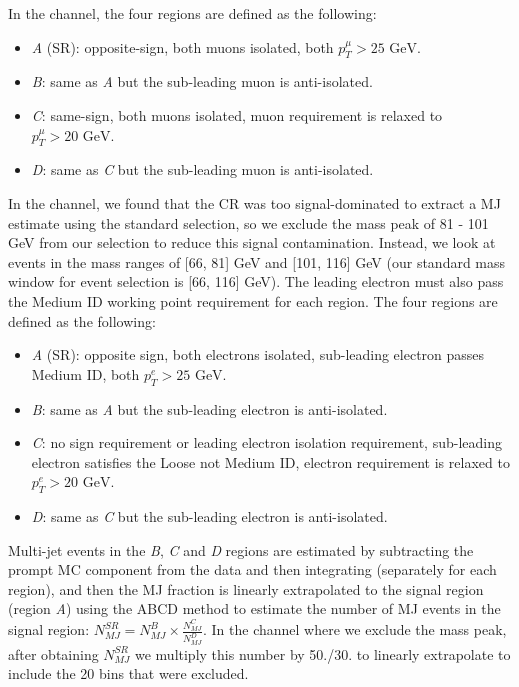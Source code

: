 In the \Zmm channel, the four regions are defined as the following:
\begin{itemize}
\item \textit{A} (SR): opposite-sign, both muons isolated, both $p_{T}^{\mu} > 25 \textrm{ GeV}$.
\item \textit{B}: same as \textit{A} but the sub-leading muon is anti-isolated.
\item \textit{C}: same-sign, both muons isolated, muon \pT requirement is relaxed to $p_{T}^{\mu} > 20 \textrm{ GeV}$.
\item \textit{D}: same as \textit{C} but the sub-leading muon is anti-isolated.
\end{itemize}

In the \Zee channel, we found that the CR was too signal-dominated to extract a MJ estimate using the standard selection, so we exclude the \Zboson mass peak of 81 - 101 GeV from our selection to reduce this signal contamination. Instead, we look at events in the \Zboson mass ranges of [66, 81] GeV and [101, 116] GeV (our standard \Zboson mass window for event selection is [66, 116] GeV). The leading electron must also pass the Medium ID working point requirement for each region. The four regions are defined as the following:

\begin{itemize}
\item \textit{A} (SR): opposite sign, both electrons isolated, sub-leading electron passes Medium ID, both $p_{T}^{e} > 25 \textrm{ GeV}$. 
\item \textit{B}: same as \textit{A} but the sub-leading electron is anti-isolated.
\item \textit{C}: no sign requirement or leading electron isolation requirement, sub-leading electron satisfies the Loose not Medium ID, electron \pT requirement is relaxed to $p_{T}^{e} > 20 \textrm{ GeV}$.
\item \textit{D}: same as \textit{C} but the sub-leading electron is anti-isolated.
\end{itemize}

Multi-jet events in the \textit{B}, \textit{C} and \textit{D} regions are estimated by subtracting the prompt MC component from the data and then integrating (separately for each region), and then the MJ fraction is linearly extrapolated to the signal region (region \textit{A}) using the ABCD method to estimate the number of MJ events in the signal region: $N_{MJ}^{SR} = N_{MJ}^{B} \times \frac{N_{MJ}^{C}}{N_{MJ}^{D}}$. In the \Zee channel where we exclude the \Zboson mass peak, after obtaining $N_{MJ}^{SR}$ we multiply this number by 50./30. to linearly extrapolate to include the 20 bins that were excluded.

